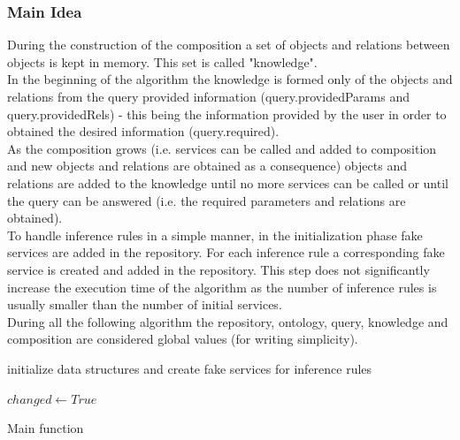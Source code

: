 \documentclass[12pt]{article}
\theoremstyle{definition}
\begin{document}
	\subsubsection{Main Idea}
	During the construction of the composition a set of objects and relations between objects is kept in memory. This set is called "knowledge".\\
	In the beginning of the algorithm the knowledge is formed only of the objects and relations from the query provided information (query.providedParams and query.providedRels) - this being the information provided by the user in order to obtained the desired information (query.required). \\
	As the composition grows (i.e. services can be called and added to composition and new objects and relations are obtained as a consequence) objects and relations are added to the knowledge until no more services can be called or until the query can be answered (i.e. the required parameters and relations are obtained).\\
	To handle inference rules in a simple manner, in the initialization phase fake services are added in the repository. For each inference rule a corresponding fake service is created and added in the repository. This step does not significantly increase the execution time of the algorithm as the number of inference rules is usually smaller than the number of initial services.\\
	During all the following algorithm the repository, ontology, query, knowledge and composition are considered global values (for writing simplicity).\\
	
	\begin{algorithm}[H]
		initialize data structures and create fake services for inference rules\;
			
		$changed \gets True$\;
		
		\caption{Main function}
	\end{algorithm}
\end{document}
